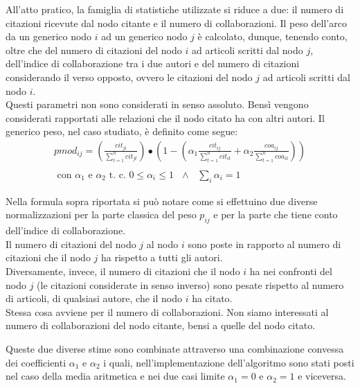 \documentclass[a4paper, 12pt]{article}
\newcommand{\citazioni}{cit}
\newcommand{\coautori}{coa}
\newcommand{\altroindice}{t}
\newcommand{\pesiPagerankModificato}{pmod}
\begin{document}
\begin{enumerate}
\begin{equation}
  \end{equation}
  \par
  All'atto pratico, la famiglia di statistiche utilizzate si riduce a due: il numero di citazioni ricevute dal nodo citante e il numero di collaborazioni. Il peso dell'arco da un generico nodo $i$ ad un generico nodo $j$ è calcolato, dunque, tenendo conto, oltre che del numero di citazioni del nodo $i$ ad articoli scritti dal nodo $j$, dell'indice di collaborazione tra i due autori e del numero di citazioni considerando il verso opposto, ovvero le citazioni del nodo $j$ ad articoli scritti dal nodo $i$. \\
  Questi parametri non sono considerati in senso assoluto. Bensì vengono considerati rapportati alle relazioni che il nodo citato ha con altri autori.
  Il generico peso, nel caso studiato, è definito come segue:
  \begin{equation}
  \begin{split}
    \pesiPagerankModificato_{ij} = 
    \left( 
      \frac
      {\displaystyle \citazioni_{ji}}
      {\displaystyle \sum_{\altroindice=1}^{n} {\citazioni_{j\altroindice}}}
    \right)
    \bullet
    \left(
      1 - 
      \left(
      \alpha_1
      \frac
      {\displaystyle \citazioni_{ij}}
      {\displaystyle \sum_{\altroindice=1}^{n} {\citazioni_{i\altroindice}}}
      +
      \alpha_2
      \frac
      {\displaystyle \coautori_{ij}}
      {\displaystyle \sum_{\altroindice=1}^{n} {\coautori_{i\altroindice}}}
      \right)
    \right) \\ \\
    \text{ con }
    \alpha_1 \text{ e }  \alpha_2 \text{  t. c. } 0 \leq \alpha_i \leq 1 \text{ } \wedge \text{ } \sum_i {\alpha_i} = 1
  \end{split}
  \end{equation} 

  Nella formula sopra riportata si può notare come si effettuino due diverse normalizzazioni per la parte classica del peso $p_{ij}$ e per la parte che tiene conto dell'indice di collaborazione. \\
  Il numero di citazioni del nodo $j$ al nodo $i$ sono poste in rapporto al numero di citazioni che il nodo $j$ ha rispetto a tutti gli autori. \\
  Diversamente, invece, il numero di citazioni che il nodo $i$ ha nei confronti del nodo $j$ (le citazioni considerate in senso inverso) sono pesate rispetto al numero di articoli, di qualsiasi autore, che il nodo $i$ ha citato. \\
  Stessa cosa avviene per il numero di collaborazioni. Non siamo interessati al numero di collaborazioni del nodo citante, bensi a quelle del nodo citato.
  \par
  Queste due diverse stime sono combinate attraverso una combinazione convessa dei coefficienti $\alpha_1$ e $\alpha_2$ i quali, nell'implementazione dell'algoritmo sono stati posti nel caso della media aritmetica e nei due casi limite $\alpha_1 = 0$ e $\alpha_2 = 1$ e viceversa.  


\end{enumerate}
\end{document}
